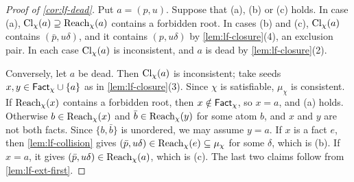 \begin{proof}[Proof of \cref{cor:lf-dead}]
Put $a=(p,u)$. Suppose that (a), (b) or (c) holds. In case (a),
$\operatorname{Cl}_\chi(a)\supseteq \operatorname{Reach}_\chi(a)$ contains a forbidden root. In cases (b) and
(c), $\operatorname{Cl}_\chi(a)$ contains $(\bar p,u\delta)$, and it contains $(p,u\delta)$
by \cref{lem:lf-closure}(4), an exclusion pair. In each case $\operatorname{Cl}_\chi(a)$ is
inconsistent, and $a$ is dead by \cref{lem:lf-closure}(2).

Conversely, let $a$ be dead. Then $\operatorname{Cl}_\chi(a)$ is inconsistent; take seeds
$x,y\in\mathsf{Fact}_\chi\cup\{a\}$ as in \cref{lem:lf-closure}(3). Since $\chi$ is
satisfiable, $\mu_\chi$ is consistent. If $\operatorname{Reach}_\chi(x)$ contains a forbidden
root, then $x\notin\mathsf{Fact}_\chi$, so $x=a$, and (a) holds. Otherwise
$b\in \operatorname{Reach}_\chi(x)$ and $\bar b\in \operatorname{Reach}_\chi(y)$ for some atom $b$, and $x$ and $y$
are not both facts. Since $\{b,\bar b\}$ is unordered, we may assume
$y=a$. If $x$ is a fact $e$, then \cref{lem:lf-collision} gives
$(\bar p,u\delta)\in \operatorname{Reach}_\chi(e)\subseteq\mu_\chi$ for some $\delta$, which is
(b). If $x=a$, it gives $(\bar p,u\delta)\in \operatorname{Reach}_\chi(a)$, which is (c). The
last two claims follow from \cref{lem:lf-ext-first}.
\end{proof}
